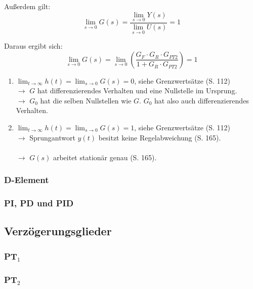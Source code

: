 \documentclass[12pt]{article}
\begin{document}
Außerdem gilt:
\[
\lim_{s \to 0} G(s) = \frac{\lim_{s \to 0} Y(s)}{\lim_{s \to 0} U(s)} = 1
\]

Daraus ergibt sich:
\[
\lim_{s \to 0} G(s)
= \lim_{s \to 0}\left(\frac{G_F \cdot G_R \cdot G_{PT2}}{1 + G_R \cdot G_{PT2}}\right)
= 1
\]

\begin{enumerate}[label=\arabic*.]
	\item \(\lim_{t \to \infty} h(t) =  \lim_{s \to 0} G(s) = 0\), siehe Grenzwertsätze (S. 112)
	\\ \(\rightarrow\) \(G\) hat differenzierendes Verhalten und eine Nullstelle im Ursprung.
	\\ \(\rightarrow\) \(G_0\) hat die selben Nullstellen wie \(G\). \(G_0\) hat also auch differenzierendes Verhalten.
	\item \(\lim_{t \to \infty} h(t) =  \lim_{s \to 0} G(s) =1\), siehe Grenzwertsätze (S. 112)
	\\ \(\rightarrow\) Sprungantwort \(y(t)\) besitzt keine Regelabweichung (S. 165).
	\\ 
	\\ \(\rightarrow\) \(G(s)\) arbeitet stationär genau (S. 165).
	\\ 
	
\end{enumerate}


\subsubsection{D-Element}
\subsubsection{PI, PD und PID}
\subsection{Verzögerungsglieder}
\subsubsection{PT\(_1\)}
\subsubsection{PT\(_2\)}
\end{document}
